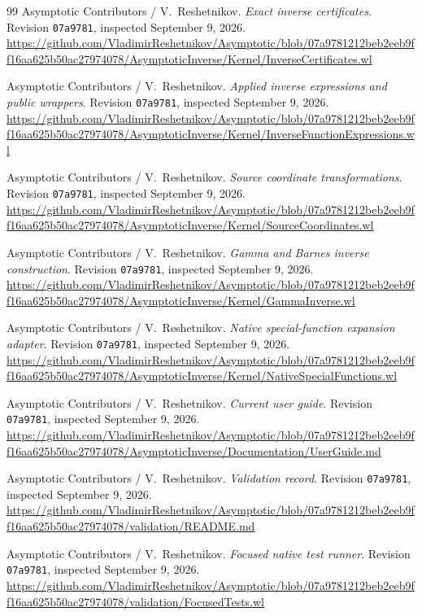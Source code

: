 \begin{thebibliography}{99}
 Asymptotic Contributors / V.~Reshetnikov. \emph{Exact inverse certificates}. Revision \texttt{07a9781}, inspected September 9, 2026. \url{https://github.com/VladimirReshetnikov/Asymptotic/blob/07a9781212beb2eeb9ff16aa625b50ac27974078/AsymptoticInverse/Kernel/InverseCertificates.wl}

 Asymptotic Contributors / V.~Reshetnikov. \emph{Applied inverse expressions and public wrappers}. Revision \texttt{07a9781}, inspected September 9, 2026. \url{https://github.com/VladimirReshetnikov/Asymptotic/blob/07a9781212beb2eeb9ff16aa625b50ac27974078/AsymptoticInverse/Kernel/InverseFunctionExpressions.wl}

 Asymptotic Contributors / V.~Reshetnikov. \emph{Source coordinate transformations}. Revision \texttt{07a9781}, inspected September 9, 2026. \url{https://github.com/VladimirReshetnikov/Asymptotic/blob/07a9781212beb2eeb9ff16aa625b50ac27974078/AsymptoticInverse/Kernel/SourceCoordinates.wl}

 Asymptotic Contributors / V.~Reshetnikov. \emph{Gamma and Barnes inverse construction}. Revision \texttt{07a9781}, inspected September 9, 2026. \url{https://github.com/VladimirReshetnikov/Asymptotic/blob/07a9781212beb2eeb9ff16aa625b50ac27974078/AsymptoticInverse/Kernel/GammaInverse.wl}

 Asymptotic Contributors / V.~Reshetnikov. \emph{Native special-function expansion adapter}. Revision \texttt{07a9781}, inspected September 9, 2026. \url{https://github.com/VladimirReshetnikov/Asymptotic/blob/07a9781212beb2eeb9ff16aa625b50ac27974078/AsymptoticInverse/Kernel/NativeSpecialFunctions.wl}

 Asymptotic Contributors / V.~Reshetnikov. \emph{Current user guide}. Revision \texttt{07a9781}, inspected September 9, 2026. \url{https://github.com/VladimirReshetnikov/Asymptotic/blob/07a9781212beb2eeb9ff16aa625b50ac27974078/AsymptoticInverse/Documentation/UserGuide.md}

 Asymptotic Contributors / V.~Reshetnikov. \emph{Validation record}. Revision \texttt{07a9781}, inspected September 9, 2026. \url{https://github.com/VladimirReshetnikov/Asymptotic/blob/07a9781212beb2eeb9ff16aa625b50ac27974078/validation/README.md}

 Asymptotic Contributors / V.~Reshetnikov. \emph{Focused native test runner}. Revision \texttt{07a9781}, inspected September 9, 2026. \url{https://github.com/VladimirReshetnikov/Asymptotic/blob/07a9781212beb2eeb9ff16aa625b50ac27974078/validation/FocusedTests.wl}


\end{thebibliography}
